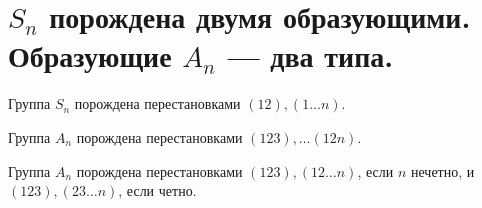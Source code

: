 % 
% 
\section{$ S_{n} $ порождена двумя образующими. Образующие $ A_n$ --- два типа.}
\begin{st}
    Группа $ S_{n} $ порождена перестановками $ (12), (1\ldots n)$.
\end{st}
\begin{st}
    Группа $ A_n$ порождена перестановками  $ (123), \ldots (12n)$.
\end{st}

\begin{st}
    Группа $ A_n$ порождена перестановками  $ (123), (12\ldots n)$, если $ n $ нечетно, и  $ (123), (23\ldots n)$,  если четно.
\end{st}

% 
